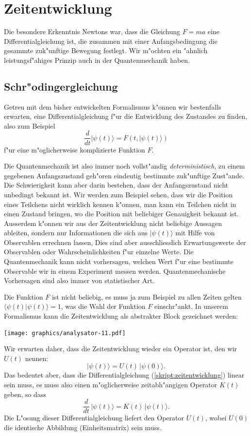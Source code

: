 %
%
\section{Zeitentwicklung}
Die besondere Erkenntnis Newtons war, dass die Gleichung $F=ma$ eine
Differentialgleichung ist, die zusammen mit einer Anfangsbedingung die
gesammte zuk"unftige Bewegung festlegt.
Wir m"ochten ein "ahnlich leistungsf"ahiges Prinzip auch in der
Quantenmechanik haben.

\subsection{Schr"odingergleichung}
Getreu mit dem bisher entwickelten Formalismus k"onnen wir bestenfalls
erwarten, eine Differentialgleichung f"ur die Entwicklung des Zustandes
zu finden, also zum Beispiel
\begin{equation}
\frac{d}{dt}|\psi(t)\rangle = F(t, |\psi(t)\rangle)
\label{skript:zeitentwicklung}
\end{equation}
f"ur eine m"oglicherweise komplizierte Funktion $F$.

Die Quantenmechanik ist also immer noch vollst"andig {\em deterministisch},
zu einem gegebenen Anfangszustand geh"oren eindeutig bestimmte
zuk"unftige Zust"ande.
Die Schwierigkeit kann aber darin bestehen, dass der Anfangszustand nicht
unbedingt bekannt ist.
Wir werden zum Beispiel sehen, dass wir die Position eines Teilchens
nicht wirklich kennen k"onnen, man kann ein Teilchen nicht in
einen Zustand bringen, wo die Position mit beliebiger Genauigkeit
bekannt ist.
Ausserdem k"onnen wir aus der Zeitentwicklung nicht beliebige Aussagen
ableiten, sondern nur Informationen die sich aus $|\psi(t)\rangle$ 
mit Hilfe von Observablen errechnen lassen,
Dies sind aber ausschliesslich Erwartungswerte der Observablen oder
Wahrscheinlichkeiten f"ur einzelne Werte.
Die Quantenmechanik kann nicht vorhersagen, welchen Wert f"ur eine
bestimmte Observable wir in einem Experiment messen werden.
Quantenmechanische Vorhersagen sind also immer von statistischer Art.


Die Funktion $F$ ist nicht beliebig, es muss ja zum Beispiel zu allen Zeiten
gelten
$\langle\psi(t)|\psi(t)\rangle=1$, was die Wahl der Funktion $F$ einschr"ankt.
In unserem Formalismus kann die Zeitentwicklung als abstrakter Block
gezeichnet werden:
\begin{center}
\texttt{[image: graphics/analysator-11.pdf]}
\end{center}
Wir erwarten daher, dass die Zeitentwicklung wieder ein Operator ist,
den wir $U(t)$ nennen:
\[
|\psi(t)\rangle = U(t)\,|\psi(0)\rangle.
\]
Das bedeutet aber, dass die Differentialgleichung (\ref{skript:zeitentwicklung})
linear sein muss, es muss also einen m"oglicherweise zeitabh"angigen
Operator $K(t)$ geben, so dass 
\begin{equation}
\frac{d}{dt}\,|\psi(t)\rangle = K(t)\,|\psi(t)\rangle.
\label{skript:zeitentwicklung-linear}
\end{equation}
Die L"osung dieser Differentialgleichung liefert den Operator $U(t)$,
wobei $U(0)$ die identische Abbildung (Einheitsmatrix) sein muss.

